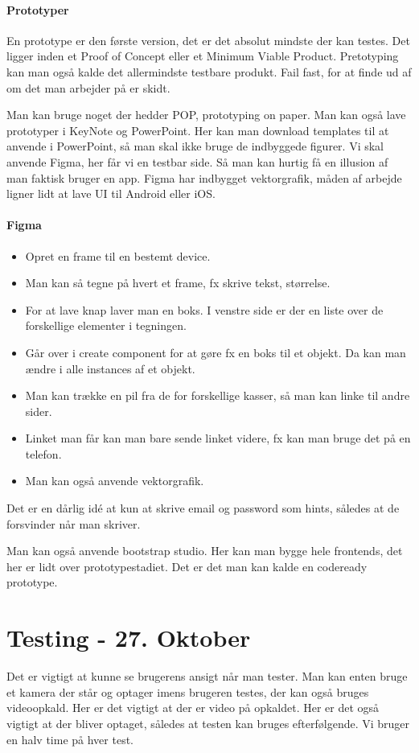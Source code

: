 \documentclass{article}
\begin{document}
\paragraph{Prototyper}
En prototype er den første version, det er det absolut mindste der kan testes.
Det ligger inden et Proof of Concept eller et Minimum Viable Product.
Pretotyping kan man også kalde det allermindste testbare produkt. Fail fast, for
at finde ud af om det man arbejder på er skidt.

Man kan bruge noget der hedder POP, prototyping on paper. Man kan også lave
prototyper i KeyNote og PowerPoint. Her kan man download templates til at
anvende i PowerPoint, så man skal ikke bruge de indbyggede figurer.
Vi skal anvende Figma, her får vi en testbar side. Så man kan hurtig få en
illusion af man faktisk bruger en app. Figma har indbygget vektorgrafik, måden
af arbejde ligner lidt at lave UI til Android eller iOS.

\paragraph{Figma}
\begin{itemize}
  \item Opret en frame til en bestemt device.
  \item Man kan så tegne på hvert et frame, fx skrive tekst, størrelse.
  \item For at lave knap laver man en boks. I venstre side er der en liste over
    de forskellige elementer i tegningen.
  \item Går over i create component for at gøre fx en boks til et objekt. Da kan
    man ændre i alle instances af et objekt.
  \item Man kan trække en pil fra de for forskellige kasser, så man kan linke
    til andre sider.
  \item Linket man får kan man bare sende linket videre, fx kan man bruge det på
    en telefon.
  \item Man kan også anvende vektorgrafik.
\end{itemize}

Det er en dårlig idé at kun at skrive email og password som hints, således at de
forsvinder når man skriver.

Man kan også anvende bootstrap studio. Her kan man bygge hele frontends, det her
er lidt over prototypestadiet. Det er det man kan kalde en codeready prototype.


\newpage
\section{Testing - 27. Oktober} 
Det er vigtigt at kunne se brugerens ansigt når man tester. Man kan enten bruge
et kamera der står og optager imens brugeren testes, der kan også bruges
videoopkald. Her er det vigtigt at der er video på opkaldet. Her er det også
vigtigt at der bliver optaget, således at testen kan bruges efterfølgende.
Vi bruger en halv time på hver test. 
\end{document}
